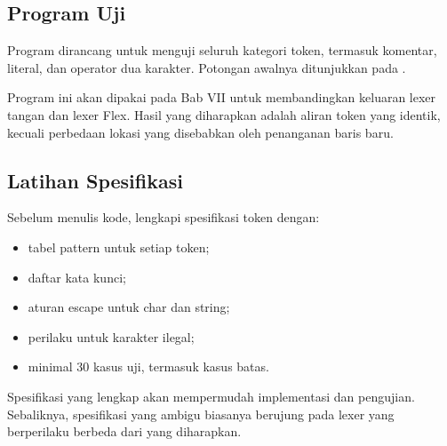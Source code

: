 \subsection{Program Uji}

Program  dirancang untuk menguji seluruh kategori
token, termasuk komentar, literal, dan operator dua karakter. Potongan
awalnya ditunjukkan pada .


Program ini akan dipakai pada Bab VII untuk membandingkan keluaran
lexer tangan dan lexer Flex. Hasil yang diharapkan adalah aliran token
yang identik, kecuali perbedaan lokasi yang disebabkan oleh penanganan
baris baru.

\subsection{Latihan Spesifikasi}

Sebelum menulis kode, lengkapi spesifikasi token dengan:
\begin{itemize}[leftmargin=*]
  \item tabel pattern untuk setiap token;
  \item daftar kata kunci;
  \item aturan escape untuk char dan string;
  \item perilaku untuk karakter ilegal;
  \item minimal 30 kasus uji, termasuk kasus batas.
\end{itemize}

Spesifikasi yang lengkap akan mempermudah implementasi dan pengujian.
Sebaliknya, spesifikasi yang ambigu biasanya berujung pada lexer yang
berperilaku berbeda dari yang diharapkan.

